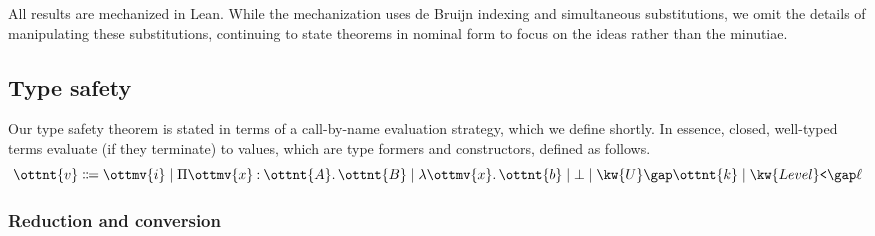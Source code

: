 \documentclass[a4paper,UKenglish,cleveref,autoref,thm-restate]{lipics-v2021}
\begin{document}
All results are mechanized in Lean.
While the mechanization uses de Bruijn indexing and simultaneous substitutions,
we omit the details of manipulating these substitutions,
continuing to state theorems in nominal form
to focus on the ideas rather than the minutiae.

\subsection{Type safety}

Our type safety theorem is stated in terms of a call-by-name evaluation strategy,
which we define shortly.
In essence, closed, well-typed terms evaluate (if they terminate) to values,
which are type formers and constructors,
defined as follows.
$$\ottnt{v} \Coloneqq \ottmv{i} \mid  \Pi  \ottmv{x}  \mathbin{:}  \ottnt{A}  \mathpunct{.}  \ottnt{B}  \mid  \lambda  \ottmv{x}  \mathpunct{.}  \ottnt{b}  \mid  \bot  \mid  \kw{U} \gap  \ottnt{k}  \mid  \kw{Level}\texttt{<} \gap  \ell $$

\subsubsection{Reduction and conversion}
\end{document}
